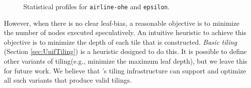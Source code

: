 \begin{figure}[tbp]
  \centering
  \hspace{2cm}
  \caption{Statistical profiles for \texttt{airline-ohe} and \texttt{epsilon}.}
\end{figure}


However, when there is no clear leaf-bias, a reasonable objective is to minimize the number of nodes executed 
speculatively. An intuitive heuristic to achieve this objective is to minimize the depth of each tile 
that is constructed. \emph{Basic tiling} (Section \ref{sec:UnifTiling}) is a heuristic designed to do this. 
It is possible to define other variants of tiling(e.g., minimize the maximum leaf depth), but we leave this for future work.
We believe that \Treebeard{}'s tiling infrastructure can support and optimize all such variants that produce valid tilings.

